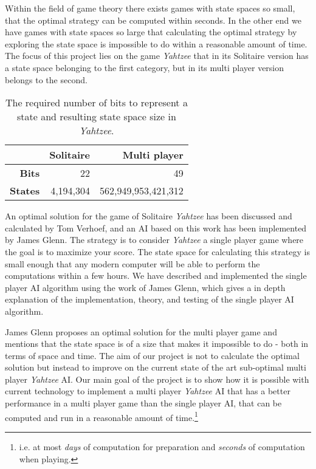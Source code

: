 Within the field of game theory there exists games with state spaces so small, that the optimal strategy can be computed within seconds. 
In the other end we have games with state spaces so large that calculating the optimal strategy by exploring the state space is impossible to do within a reasonable amount of time.
The focus of this project lies on the game \emph{Yahtzee} that in its Solitaire version has a state space belonging to the first category, but in its multi player version belongs to the second.

\begin{table}[h] %
\centering
\begin{tabular}{|r|r|r|}
\hline
&\textbf{Solitaire} & \textbf{Multi player} 		\\ \hline
\textbf{Bits} 	& 22		&  49 					\\ \hline
\textbf{States} & 4,194,304	&  562,949,953,421,312	\\ \hline	

\end{tabular}
\caption{The required number of bits to represent a state and resulting state space size in \emph{Yahtzee}.}
\end{table}


An optimal solution for the game of Solitaire \emph{Yahtzee} has been discussed and calculated by Tom Verhoef\cite{verhoeff2004optimal}, and an AI based on this work has been implemented by James Glenn\cite{glenn2006optimal}.
The strategy is to consider \emph{Yahtzee} a single player game where the goal is to maximize your score. 
The state space for calculating this strategy is small enough that any modern computer will be able to perform the computations within a few hours.
We have described and implemented the single player AI algorithm using the work of James Glenn, which gives a in depth explanation of the implementation, theory, and testing of the single player AI algorithm.

James Glenn proposes an optimal solution for the multi player game and mentions that the state space is of a size that makes it impossible to do - both in terms of space and time.
The aim of our project is not to calculate the optimal solution but instead to improve on the current state of the art sub-optimal multi player \emph{Yahtzee} AI. 
Our main goal of the project is to show how it is possible with current technology to implement a multi player \emph{Yahtzee} AI that has a better performance in a multi player game than the single player AI, that can be computed and run in a reasonable amount of time.\footnote{i.e. at most \emph{days} of computation for preparation and \emph{seconds} of computation when playing.}

